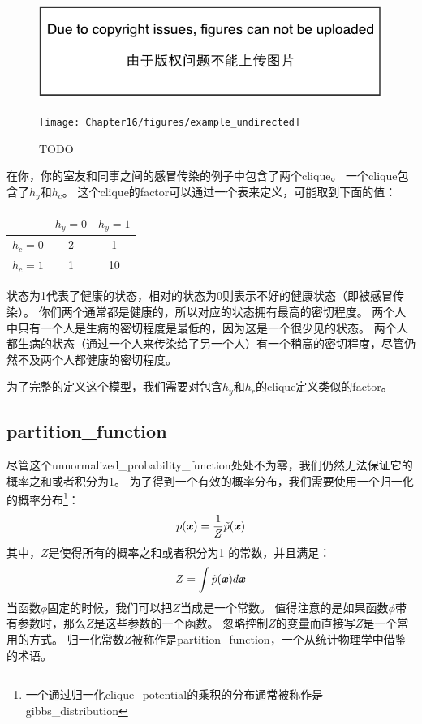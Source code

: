 \begin{figure}[!htb]
\ifOpenSource
\centerline{\includegraphics{figure.pdf}}
\else
	\centerline{\texttt{[image: Chapter16/figures/example\_undirected]}}
\fi
	\caption{TODO}
	\label{fig:example_undirected}
\end{figure}



在你，你的室友和同事之间的感冒传染的例子中包含了两个\gls{clique}。
一个\gls{clique}包含了$h_y$和$h_c$。
这个\gls{clique}的\gls{factor}可以通过一个表来定义，可能取到下面的值：
\begin{table}[!hbp]
	\center
	\begin{tabular}{c|cc}
		& $h_y = 0$ & $h_y = 1$ \\ \hline
		$h_c = 0$ & 2 & 1 \\
		$h_c = 1$  & 1 & 10 \\
	\end{tabular}
\end{table}


状态为1代表了健康的状态，相对的状态为0则表示不好的健康状态（即被感冒传染）。
你们两个通常都是健康的，所以对应的状态拥有最高的密切程度。
两个人中只有一个人是生病的密切程度是最低的，因为这是一个很少见的状态。
两个人都生病的状态（通过一个人来传染给了另一个人）有一个稍高的密切程度，尽管仍然不及两个人都健康的密切程度。


为了完整的定义这个模型，我们需要对包含$h_y$和$h_r$的\gls{clique}定义类似的\gls{factor}。


\subsection{\gls{partition_function}}
\label{sec:the_partition_function}



尽管这个\gls{unnormalized_probability_function}处处不为零，我们仍然无法保证它的概率之和或者积分为1。
为了得到一个有效的概率分布，我们需要使用一个归一化的概率分布\footnote{一个通过归一化\gls{clique_potential}的乘积的分布通常被称作是\gls{gibbs_distribution}}：
\begin{align}
p(\boldsymbol{\mathit{x}}) = \frac{1}{Z}\tilde{p}(\boldsymbol{\mathit{x}})
\end{align}
其中，$Z$是使得所有的概率之和或者积分为1 的常数，并且满足：
\begin{align}
Z = \int \tilde{p}(\boldsymbol{\mathit{x}})d\boldsymbol{\mathit{x}}
\end{align}
当函数$\phi$固定的时候，我们可以把$Z$当成是一个常数。
值得注意的是如果函数$\phi$带有参数时，那么$Z$是这些参数的一个函数。
忽略控制$Z$的变量而直接写$Z$是一个常用的方式。
归一化常数$Z$被称作是\gls{partition_function}，一个从统计物理学中借鉴的术语。


